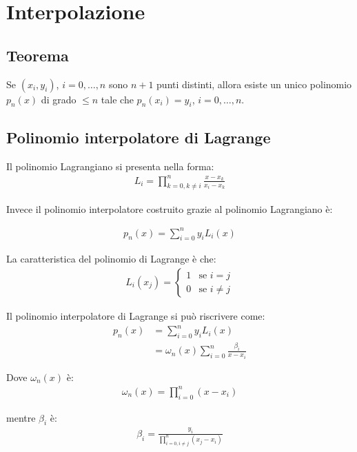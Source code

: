 \chapter{Interpolazione}

\section{Teorema}
Se $(x_i, y_i)$, $i=0, \ldots, n$ sono $n+1$ punti distinti, allora esiste un unico polinomio $p_n(x)$ di grado $\leq n$ tale che $p_n(x_i)=y_i$, $i=0, \ldots, n$.




\section{Polinomio interpolatore di Lagrange}

Il polinomio Lagrangiano si presenta nella forma:
\begin{align}
  L_i = \prod_{k=0, k\neq i}^n \frac{x - x_k}{x_i - x_k}
\end{align}

Invece il polinomio interpolatore costruito grazie al polinomio Lagrangiano è:

\begin{align}
  p_n(x) = \sum_{i=0}^n y_i L_i(x)
\end{align}

La caratteristica del polinomio di Lagrange è che:
\begin{align}
  L_i(x_j) = \begin{cases}
    1 & \text{se } i = j \\
    0 & \text{se } i \neq j
  \end{cases}
\end{align}

Il polinomio interpolatore di Lagrange si può riscrivere come:
\begin{align}
  p_n(x)  &= \sum_{i=0}^n y_i L_i(x) \\
          &= \omega_n(x) \sum_{i = 0}^n \frac{\beta_i}{x-x_i}
\end{align}

Dove $\omega_n(x)$ è:
\begin{align}
  \omega_n(x) = \prod_{i=0}^n (x-x_i)
\end{align}


mentre $\beta_i$ è:
\begin{align}
  \beta_i = \frac{y_i}{\prod_{i=0, i\neq j}^n (x_j - x_i)}
\end{align}

